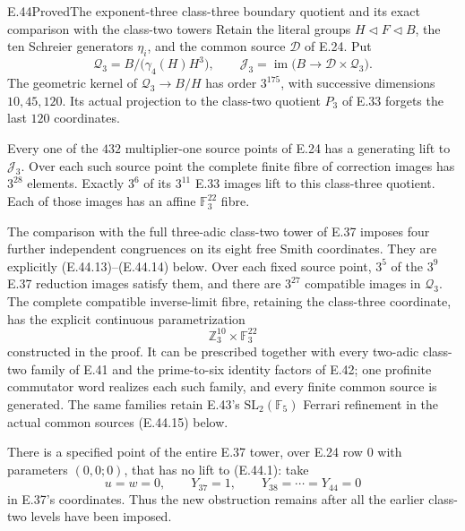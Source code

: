 \begin{statement}{E.44}{Proved}{The exponent-three class-three boundary quotient and its exact comparison with the class-two towers}
Retain the literal groups $H\triangleleft F\triangleleft B$,
the ten Schreier generators $\eta_i$, and the common source
$\mathscr D$ of E.24.  Put
\[
 \mathcal Q_3=B/\bigl(\gamma_4(H)H^3\bigr),\qquad
 \mathcal J_3=\operatorname{im}
       \bigl(B\longrightarrow\mathscr D\times\mathcal Q_3\bigr).
 \tag{E.44.1}
\]
The geometric kernel of $\mathcal Q_3\to B/H$ has order
$3^{175}$, with successive dimensions $10,45,120$.
Its actual projection to the class-two quotient $P_3$ of
E.33 forgets the last $120$ coordinates.

Every one of the $432$ multiplier-one source points of
E.24 has a generating lift to $\mathcal J_3$.
Over each such source point the complete finite fibre
of correction images has $3^{28}$ elements.
Exactly $3^6$ of its $3^{11}$ E.33 images lift to this
class-three quotient.  Each of those images has an
affine $\mathbb F_3^{22}$ fibre.

The comparison with the full three-adic class-two
tower of E.37 imposes four further independent
congruences on its eight free Smith coordinates.
They are explicitly \textup{(E.44.13)--(E.44.14)} below.
Over each fixed source point, $3^5$ of the $3^9$
E.37 reduction images satisfy them, and there are
$3^{27}$ compatible images in $\mathcal Q_3$.
The complete compatible inverse-limit fibre, retaining
the class-three coordinate, has the explicit continuous
parametrization
\[
                    \mathbb Z_3^{10}\times\mathbb F_3^{22}
 \tag{E.44.2}
\]
constructed in the proof.  It can be prescribed together
with every two-adic class-two family of E.41 and the
prime-to-six identity factors of E.42; one profinite
commutator word realizes each such family, and every
finite common source is generated.
The same families retain E.43's $\mathrm{SL}_2(\mathbb F_5)$
Ferrari refinement in the actual common sources
\textup{(E.44.15)} below.

There is a specified point of the entire E.37 tower,
over E.24 row $0$ with parameters $(0,0;0)$, that has
no lift to \textup{(E.44.1)}: take
\[
 u=w=0,\qquad Y_{37}=1,\qquad
                 Y_{38}=\cdots=Y_{44}=0
 \tag{E.44.3}
\]
in E.37's coordinates.  Thus the new obstruction
remains after all the earlier class-two levels have
been imposed.
\end{statement}
